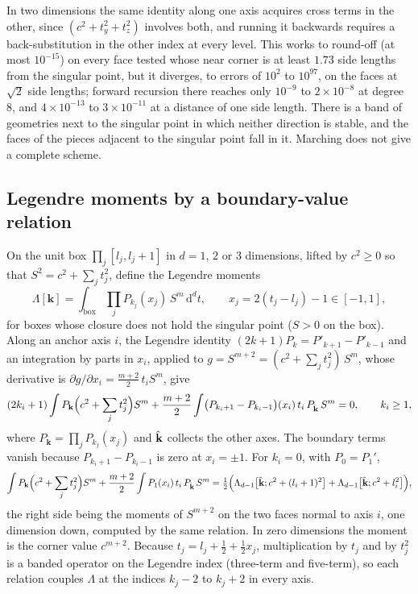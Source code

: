 \documentclass[11pt,a4paper]{article}
\newcommand{\dd}{\mathrm{d}}
\newcommand{\uvec}[1]{{\hat{\mathbf{#1}\mkern-3mu}\mkern3mu}}
\begin{document}
In two dimensions the same identity along one axis acquires cross terms in the other, since
$(c^2+t_y^2+t_z^2)$ involves both, and running it backwards requires a back-substitution in the other index
at every level. This works to round-off (at most $10^{-15}$) on every face tested whose near corner is at
least $1.73$ side lengths from the singular point, but it diverges, to errors of $10^2$ to $10^{97}$, on the
faces at $\sqrt2$ side lengths; forward recursion there reaches only $10^{-9}$ to $2\times10^{-8}$ at
degree $8$, and $4\times10^{-13}$ to $3\times10^{-11}$ at a distance of one side length. There is a band of
geometries next to the singular point in which neither direction is stable, and the faces of the pieces
adjacent to the singular point fall in it. Marching does not give a complete scheme.

\subsection{Legendre moments by a boundary-value relation}\label{sec:legendre}

On the unit box $\prod_j[l_j,l_j+1]$ in $d=1$, $2$ or $3$ dimensions, lifted by $c^2\ge0$ so that
$S^2=c^2+\sum_jt_j^2$, define the Legendre moments
\begin{equation}\label{eq:lam}
  \Lambda[\mathbf{k}]=\int_{\text{box}}\prod_jP_{k_j}(x_j)\,S^m\,\dd^dt,\qquad x_j=2(t_j-l_j)-1\in[-1,1],
\end{equation}
for boxes whose closure does not hold the singular point ($S>0$ on the box). Along an anchor axis $i$, the
Legendre identity $(2k+1)P_k=P'_{k+1}-P'_{k-1}$ and an integration by parts in $x_i$, applied to
$g=S^{m+2}=(c^2+\sum_jt_j^2)\,S^m$, whose derivative is $\partial g/\partial x_i=\frac{m+2}{2}\,t_iS^m$, give
\begin{equation}\label{eq:relation}
  (2k_i+1)\int P_{\mathbf{k}}\Bigl(c^2+\sum_jt_j^2\Bigr)S^m
  +\frac{m+2}{2}\int\bigl(P_{k_i+1}-P_{k_i-1}\bigr)(x_i)\,t_i\,P_{\uvec{k}}\,S^m=0,\qquad k_i\ge1,
\end{equation}
where $P_{\mathbf{k}}=\prod_jP_{k_j}(x_j)$ and $\uvec{k}$ collects the other axes. The boundary
terms vanish because $P_{k_i+1}-P_{k_i-1}$ is zero at $x_i=\pm1$. For $k_i=0$, with $P_0=P_1'$,
\begin{equation}\label{eq:relation0}
  \int P_{\mathbf{k}}\Bigl(c^2+\sum_jt_j^2\Bigr)S^m+\frac{m+2}{2}\int P_1(x_i)\,t_i\,P_{\uvec{k}}\,S^m
  =\tfrac12\Bigl(\Lambda_{d-1}\bigl[\uvec{k};c^2+(l_i+1)^2\bigr]+\Lambda_{d-1}\bigl[\uvec{k};
  c^2+l_i^2\bigr]\Bigr),
\end{equation}
the right side being the moments of $S^{m+2}$ on the two faces normal to axis $i$, one dimension down,
computed by the same relation. In zero dimensions the moment is the corner value $c^{m+2}$. Because
$t_j=l_j+\tfrac12+\tfrac12x_j$, multiplication by $t_j$ and by $t_j^2$ is a banded operator on the
Legendre index (three-term and five-term), so each relation couples $\Lambda$ at the indices $k_j-2$ to
$k_j+2$ in every axis.
\end{document}
